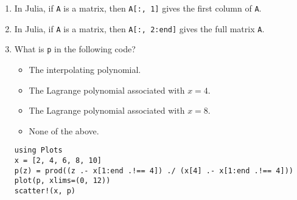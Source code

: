 \documentclass{article}
\newcommand{\julia}[1]{\texttt{#1}}
\begin{document}
\begin{enumerate}
    \item
        In Julia, if \julia{A} is a matrix, then \julia{A[:, 1]} gives the first column of \julia{A}.

    \item
        In Julia, if \julia{A} is a matrix, then \julia{A[:, 2:end]} gives the full matrix \julia{A}.

    \item
        What is \julia{p} in the following code?
        \begin{itemize}[label=$\circ$]
            \item The interpolating polynomial.
            \item The Lagrange polynomial associated with $x = 4$.
            \item The Lagrange polynomial associated with $x = 8$.
            \item None of the above.
        \end{itemize}
        \begin{verbatim}
using Plots
x = [2, 4, 6, 8, 10]
p(z) = prod((z .- x[1:end .!== 4]) ./ (x[4] .- x[1:end .!== 4]))
plot(p, xlims=(0, 12))
scatter!(x, p)
        \end{verbatim}
\end{enumerate}
\end{document}
